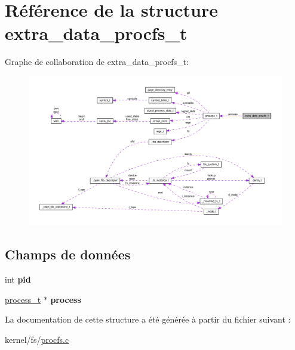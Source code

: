 \hypertarget{structextra__data__procfs__t}{\section{\-Référence de la structure extra\-\_\-data\-\_\-procfs\-\_\-t}
\label{structextra__data__procfs__t}
}


\-Graphe de collaboration de extra\-\_\-data\-\_\-procfs\-\_\-t\-:\nopagebreak
\begin{figure}[H]
\begin{center}
\leavevmode
\includegraphics[width=350pt]{structextra__data__procfs__t__coll__graph}
\end{center}
\end{figure}
\subsection*{\-Champs de données}
\begin{DoxyCompactItemize}
\item 
\hypertarget{structextra__data__procfs__t_ad501deb466cabf589b4617eac9bcce30}{int {\bfseries pid}}\label{structextra__data__procfs__t_ad501deb466cabf589b4617eac9bcce30}

\item 
\hypertarget{structextra__data__procfs__t_a43e451440ca4470e67c59f6ca0da1e03}{\hyperlink{structprocess__t}{process\-\_\-t} $\ast$ {\bfseries process}}\label{structextra__data__procfs__t_a43e451440ca4470e67c59f6ca0da1e03}

\end{DoxyCompactItemize}


\-La documentation de cette structure a été générée à partir du fichier suivant \-:\begin{DoxyCompactItemize}
\item 
kernel/fs/\hyperlink{procfs_8c}{procfs.\-c}\end{DoxyCompactItemize}

